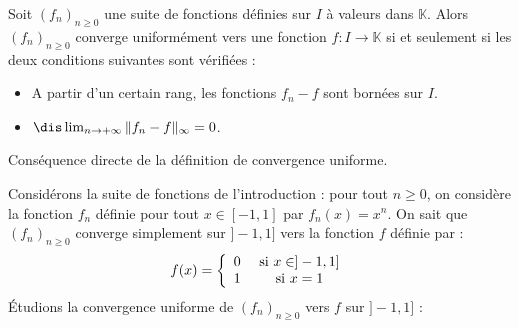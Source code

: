 \documentclass[a4paper,10pt]{report}
\begin{document}
\begin{prop}  Soit $(f_n)_{n \geq 0}$ une suite de fonctions définies sur $I$ à valeurs dans $\mathbb{K}$. Alors $(f_n)_{n \geq 0}$ converge uniformément vers une fonction $f : I \rightarrow \mathbb{K}$ si et seulement si les deux conditions suivantes sont vérifiées :  

\begin{itemize}
\item A partir d'un certain rang, les fonctions $f_n-f$ sont bornées sur $I$.
\item $\dis \lim_{n \rightarrow + \infty} \Vert f_n - f  \Vert_{\infty} =0$.
\end{itemize}
\end{prop}

\begin{preuve} Conséquence directe de la définition de convergence uniforme.
%
\end{preuve}

\medskip

\begin{ex} Considérons la suite de fonctions de l'introduction : pour tout $n \geq 0$, on considère la fonction $f_n$ définie pour tout $x \in [-1,1]$ par $f_n(x)=x^n$. On sait que $(f_n)_{n \geq 0}$ converge simplement sur $]-1,1]$ vers la fonction $f$ définie par :
$$ f(x) = \left\lbrace \begin{array}{ccl}
0 & \hbox{ si } x \in ]-1,1] \\
1 & \hbox{ si } x =1 \\
\end{array}\right. $$
Étudions la convergence uniforme de $(f_n)_{n \geq 0}$ vers $f$ sur $]-1,1]$ :

\vspace{7cm}
\end{ex}
\end{document}
